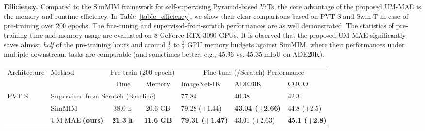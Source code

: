 \documentclass{article}
\begin{document}
\textbf{Efficiency.} Compared to the SimMIM framework for self-supervising Pyramid-based ViTs, the core advantage of the proposed UM-MAE is the memory and runtime efficiency. In Table~\ref{table_efficiency}, we show their clear comparisons based on PVT-S and Swin-T in case of pre-training over 200 epochs. The fine-tuning and supervised-from-scratch performances are as well demonstrated. The statistics of pre-training time and memory usage are evaluated on 8 GeForce RTX 3090 GPUs. It is observed that the proposed UM-MAE significantly saves almost \emph{half} of the pre-training hours and around { $\frac{1}{2} $ to $ \frac{2}{3}$ GPU memory budgets} against SimMIM, where their performances under multiple downstream tasks are comparable (and sometimes better, e.g., 45.96 vs. 45.35 mIoU on ADE20K). 


\begin{table}
	\vspace{0pt}
    \renewcommand\arraystretch{1.2}
\footnotesize
    \centering
    \resizebox{0.92\textwidth}{!}
    {
        \begin{tabular}{l|l||c|c||l|l|l}
        \hline
        \multirow{2}{*}{Architecture}& \multirow{2}{*}{Method} & \multicolumn{2}{c||}{Pre-train { (200 epoch)} } & \multicolumn{3}{c}{Fine-tune (/Scratch) Performance}
        \\\cline{3-7}
         & &  Time & Memory & ImageNet-1K &  ADE20K & COCO \\
        \hline
        \multirow{3}{*}{PVT-S~\cite{wang2021pyramid}} & \multicolumn{3}{l||}{Supervised from Scratch (Baseline)}  & 77.84 & 40.38 & 42.3 \\ \cline{2-7}
        & SimMIM~\cite{xie2021simmim} &  38.0 h & 20.6 GB & 79.28 {\scriptsize (+1.44)} & \textbf{43.04 {\scriptsize (+2.66)}} & 44.8 {\scriptsize (+2.5)}  \\
        & UM-MAE \textbf{(ours)} & \textbf{21.3 h}  & \textbf{11.6 GB} & \textbf{79.31 {\scriptsize (+1.47)}} & 43.01 {\scriptsize (+2.63)} & \textbf{45.1 {\scriptsize (+2.8)}} \\ \hline
        

\end{tabular}}
\end{table}
\end{document}
